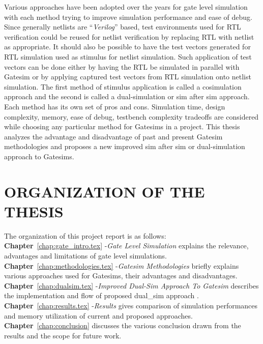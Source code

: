 Various approaches have been adopted over the years for gate level simulation with each method trying to improve simulation performance and ease of debug. Since generally netlists are ``{\it Verilog}'' based, test environments used for RTL verification could be reused for netlist verification by replacing RTL with netlist as appropriate. It should also be possible to have the test vectors generated for RTL simulation used as stimulus for netlist simulation. Such application of test vectors can be done either by having the RTL be simulated in parallel with Gatesim or by applying captured test vectors from RTL simulation onto netlist simulation. The first method of stimulus application is called a cosimulation approach and the second is called a dual-simulation or sim after sim approach. Each method has its own set of pros and cons. Simulation time, design complexity, memory, ease of debug, testbench complexity tradeoffs are considered while choosing any particular method for Gatesims in a project. This thesis analyzes the advantage and disadvantage of past and present Gatesim methodologies and  proposes a new improved sim after sim or dual-simulation approach to Gatesims. 



\section{ORGANIZATION OF THE THESIS}
The organization of this project report is as follows:\\
\noindent 
{\bf Chapter}~\ref{chap:gate_intro.tex} -{\it Gate Level Simulation} explains the relevance, advantages and limitations of gate level simulations.\\
{\bf Chapter}~\ref{chap:methodologies.tex} -{\it Gatesim Methodologies} briefly explains various approaches used for Gatesims, their advantages and disadvantages.\\
{\bf Chapter}~\ref{chap:dualsim.tex} -{\it Improved Dual-Sim Approach To Gatesim} describes the implementation and flow of proposed dual_sim approach .\\
{\bf Chapter}~\ref{chap:results.tex} -{\it Results} gives comparison of simulation performances and memory utilization of current and proposed approaches.\\
{\bf Chapter}~\ref{chap:conclusion} discusses the various conclusion drawn from the results and the scope for future work.

